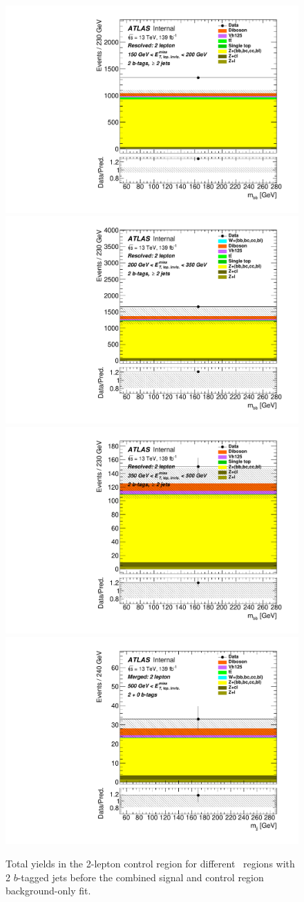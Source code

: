 \begin{figure}[!htb]
  \includegraphics[width=0.46\linewidth]{chapters/c9/figures/Region_distmBB_J2_L2_T2_DCR2_Y2015_incJet1_Fat0_incFat1_BMin150_BMax200_Prefit.pdf}
  \includegraphics[width=0.46\linewidth]{chapters/c9/figures/Region_distmBB_J2_L2_T2_DCR2_Y2015_incJet1_Fat0_incFat1_BMin200_BMax350_Prefit.pdf}\\
  \includegraphics[width=0.46\linewidth]{chapters/c9/figures/Region_distmBB_J2_L2_T2_DCR2_Y2015_incJet1_Fat0_incFat1_BMin350_BMax500_Prefit.pdf}
  \includegraphics[width=0.46\linewidth]{chapters/c9/figures/Region_BMin500_incFat1_Fat1_incJet1_Y2015_DCR2_T20_L2_distmBB_J0_Prefit.pdf}
\caption{Total yields in the 2-lepton control region for different \met~regions with \\2 $b$-tagged jets before the combined signal and control region background-only fit.}
\label{fig:Data_MC_CR2_ll_m_jj_2b}
\end{figure}




